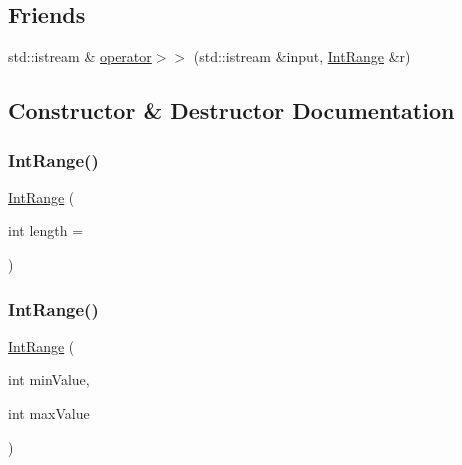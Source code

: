 \subsection*{Friends}
\begin{DoxyCompactItemize}
\item 
std\+::istream \& \mbox{\hyperlink{classIntRange_a4b452901f18832cc506afd0f320e5934}{operator$>$$>$}} (std\+::istream \&input, \mbox{\hyperlink{classIntRange}{Int\+Range}} \&r)
\end{DoxyCompactItemize}


\subsection{Constructor \& Destructor Documentation}
\mbox{\label{classIntRange_a1371e812388f10db89e8cea0edeec000}} 
\subsubsection{\texorpdfstring{Int\+Range()}{IntRange()}\hspace{0.1cm}{\footnotesize\ttfamily [1/2]}}
{\footnotesize\ttfamily \mbox{\hyperlink{classIntRange}{Int\+Range}} (\begin{DoxyParamCaption}\item[{int}]{length = {} }\end{DoxyParamCaption})}

\mbox{\label{classIntRange_a9e8543f0451b16061adafee2d9ad0f84}} 
\subsubsection{\texorpdfstring{Int\+Range()}{IntRange()}\hspace{0.1cm}{\footnotesize\ttfamily [2/2]}}
{\footnotesize\ttfamily \mbox{\hyperlink{classIntRange}{Int\+Range}} (\begin{DoxyParamCaption}\item[{int}]{min\+Value,  }\item[{int}]{max\+Value }\end{DoxyParamCaption})}



